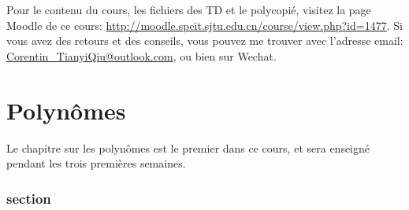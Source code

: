 \documentclass{article}
\begin{document}
Pour le contenu du cours, les fichiers des TD et le polycopié, visitez la page Moodle de ce cours: \url{http://moodle.speit.sjtu.edu.cn/course/view.php?id=1477}. Si vous avez des retours et des conseils, vous pouvez me trouver avec l'adresse email: \url{Corentin\_TianyiQiu@outlook.com}, ou bien sur Wechat. 


\newpage
\tableofcontents

\newpage

\part{Polynômes}

Le chapitre sur les polynômes est le premier dans ce cours, et sera enseigné pendant les trois premières semaines.


\section{section}
\end{document}
